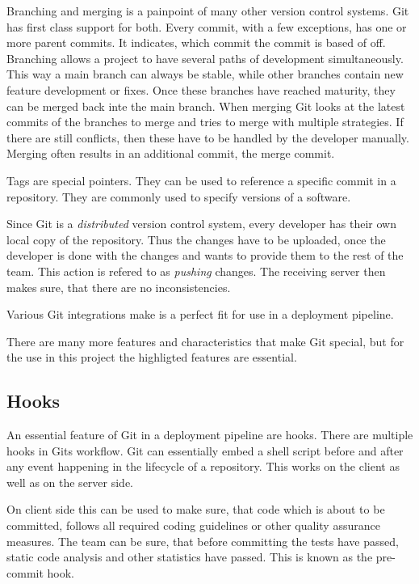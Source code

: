 Branching and merging is a painpoint of many other version control systems. Git
has first class support for both. Every commit, with a few exceptions, has one
or more parent commits. It indicates, which commit the commit is based of off.
Branching allows a project to have several paths of development simultaneously.
This way a main branch can always be stable, while other branches contain new
feature development or fixes. Once these branches have reached maturity, they
can be merged back inte the main branch. When merging Git looks at the latest
commits of the branches to merge and tries to merge with multiple strategies.
If there are still conflicts, then these have to be handled by the developer
manually. Merging often results in an additional commit, the merge commit.

Tags are special pointers. They can be used to reference a specific commit in a
repository. They are commonly used to specify versions of a software.

Since Git is a \textit{distributed} version control system, every developer has
their own local copy of the repository. Thus the changes have to be uploaded,
once the developer is done with the changes and wants to provide them to the
rest of the team. This action is refered to as \textit{pushing} changes. The
receiving server then makes sure, that there are no inconsistencies.

Various Git integrations make is a perfect fit for use in a deployment
pipeline.

There are many more features and characteristics that make Git special, but for
the use in this project the highligted features are essential.

\subsection{Hooks}

An essential feature of Git in a deployment pipeline are hooks. There are
multiple hooks in Gits workflow. Git can essentially embed a shell script
before and after any event happening in the lifecycle of a repository. This
works on the client as well as on the server side.

On client side this can be used to make sure, that code which is about to be
committed, follows all required coding guidelines or other quality assurance
measures. The team can be sure, that before committing the tests have passed,
static code analysis and other statistics have passed. This is known as the
pre-commit hook.

